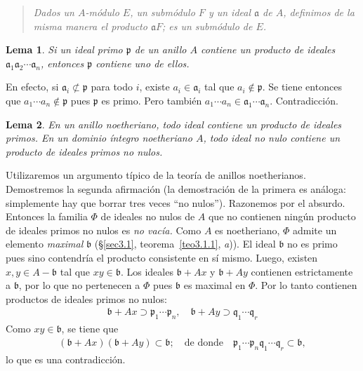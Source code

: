 \documentclass[bibtotoc,leqno,spanish]{amsbook}
\newcommand{\idl}[1]{\mathfrak{#1}}
\numberwithin{equation}{section}
\newenvironment{comm}%
	{\begin{quotation}\itshape}
	{\end{quotation}}
\theoremstyle{note}
\theoremstyle{note}
\newtheorem{lemma}{Lema}
\theoremstyle{rem}
\numberwithin{theorem}{section}
\numberwithin{proposition}{section}
\numberwithin{definition}{section}
\numberwithin{lemma}{section}
\numberwithin{corollary}{section}
\numberwithin{example}{section}
\numberwithin{footnote}{section}%
\begin{document}
\begin{comm}
Dados un $A$-m\'odulo $E$, un subm\'odulo $F$ y un ideal $\idl{a}$ de $A$, definimos
de la misma manera el producto $\idl{a}F$; es un subm\'odulo de $E$.
\end{comm}

\begin{lemma}\label{lem3.3.2}
Si un ideal primo $\idl{p}$ de un anillo $A$ contiene un producto de ideales
$\idl{a}_{1}\idl{a}_{2}\cdots\idl{a}_{n}$, entonces $\idl{p}$ contiene uno de ellos.
\end{lemma}

En efecto, si $\idl{a}_{i}\not\subset\idl{p}$ para todo $i$, existe $a_{i}\in\idl{a}_{i}$ tal que
$a_{i}\notin\idl{p}$. Se tiene entonces que $a_{1}\cdots a_{n}\notin\idl{p}$ pues $\idl{p}$
es primo. Pero tambi\'en $a_{1}\cdots a_{n}\in\idl{a}_{1}\cdots\idl{a}_{n}$. Contradicci\'on.

\begin{lemma}\label{lem3.3.3}
En un anillo noetheriano, todo ideal contiene un producto de ideales primos. En un dominio \'integro noetheriano
$A$, todo ideal no nulo contiene un producto de ideales primos no nulos.
\end{lemma}

Utilizaremos un argumento t\'ipico de la teor\'ia de anillos noetherianos. Demostremos la segunda
afirmaci\'on (la demostraci\'on de la primera es an\'aloga: simplemente hay que borrar tres
veces ``no nulos''). Razonemos por el absurdo. Entonces la familia $\Phi$ de ideales no nulos de $A$ que
no contienen ning\'un producto de ideales primos no nulos es {\em no vac\'ia.} Como $A$ es noetheriano,
$\Phi$ admite un elemento {\em maximal} $\idl{b}$ (\S\ref{sec3.1}, teorema~\ref{teo3.1.1}, {\itshape a})).
El ideal $\idl{b}$ no es primo pues
sino contendr\'ia el producto consistente en s\'i mismo. Luego, existen $x, y\in A-\idl{b}$ tal que
$xy\in\idl{b}$. Los ideales $\idl{b}+Ax$ y $\idl{b}+Ay$ contienen estrictamente a $\idl{b}$, por lo que
no pertenecen a $\Phi$ pues $\idl{b}$ es maximal en $\Phi$. Por lo tanto contienen productos de ideales
primos no nulos:
\begin{gather*}
\idl{b}+Ax\supset\idl{p}_{1}\cdots\idl{p}_{n},\quad\idl{b}+Ay\supset\idl{q}_{1}\cdots\idl{q}_{r}
\end{gather*}
Como $xy\in\idl{b}$, se tiene que
\begin{gather*}
(\idl{b}+Ax)(\idl{b}+Ay)\subset\idl{b};\quad\text{de donde}\quad\idl{p}_{1}\cdots\idl{p}_{n}\idl{q}_{1}\cdots
\idl{q}_{r}\subset\idl{b},
\end{gather*}
lo que es una contradicci\'on.
\end{document}
